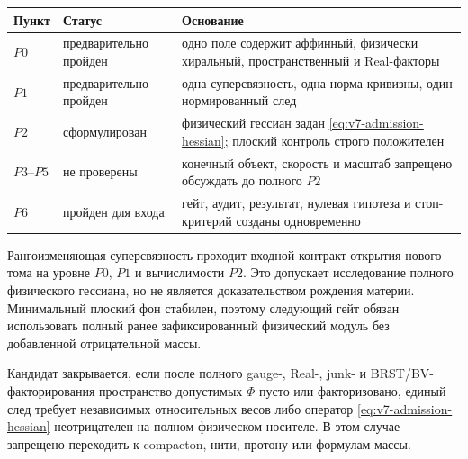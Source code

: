 \begin{center}
\begin{tabular}{p{}p{}p{}}
\toprule
Пункт & Статус & Основание \\
\midrule
$P0$ & предварительно пройден & одно поле содержит аффинный, физически
хиральный, пространственный и Real-факторы \\
$P1$ & предварительно пройден & одна суперсвязность, одна норма кривизны,
один нормированный след \\
$P2$ & сформулирован & физический гессиан задан
\eqref{eq:v7-admission-hessian}; плоский контроль строго положителен \\
$P3$--$P5$ & не проверены & конечный объект, скорость и масштаб запрещено
обсуждать до полного $P2$ \\
$P6$ & пройден для входа & гейт, аудит, результат, нулевая гипотеза и
стоп-критерий созданы одновременно \\
\bottomrule
\end{tabular}
\end{center}

\begin{theorem}
Рангоизменяющая суперсвязность проходит входной контракт открытия нового
тома на уровне $P0$, $P1$ и вычислимости $P2$. Это допускает исследование
полного физического гессиана, но не является доказательством рождения
материи. Минимальный плоский фон стабилен, поэтому следующий гейт обязан
использовать полный ранее зафиксированный физический модуль без добавленной
отрицательной массы.
\end{theorem}

\begin{nogocriterion}
Кандидат закрывается, если после полного gauge-, Real-, junk- и
BRST/BV-факторирования пространство допустимых $\Phi$ пусто или факторизовано,
единый след требует независимых относительных весов либо оператор
\eqref{eq:v7-admission-hessian} неотрицателен на полном физическом носителе.
В этом случае запрещено переходить к compacton, нити, протону или формулам
массы.
\end{nogocriterion}

